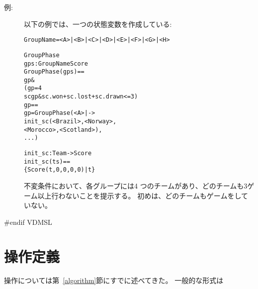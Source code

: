 \documentclass[\pformat,12pt]{jarticle}
\begin{document}
\begin{description}
\item[例:] 以下の例では、一つの状態変数を作成している:
  \begin{alltt}

  GroupName = <A> | <B> | <C> | <D> | <E> | <F> | <G> | <H>

   GroupPhase 
    gps :  GroupName  Score
  GroupPhase(gps) ==
     gp  & 
      ( gp = 4 
        sc  gp & sc.won + sc.lost + sc.drawn <= 3)
   gp ==
    gp = GroupPhase ({ <A> |-> 
                                init_sc ({<Brazil>, <Norway>, 
                                    <Morocco>, <Scotland>}),
                         ...})


  init_sc :  Team ->  Score
  init_sc (ts) ==
    \{ Score (t,0,0,0,0) | t  \}
  \end{alltt}
  不変条件において、各グループには4 つのチームがあり、どのチームも3ゲーム以上行わないことを提示する。
  初めは、どのチームもゲームをしていない。

\end{description}
#endif VDMSL

\section{操作定義} \label{op-def}

操作については第~\ref{algorithm}節にすでに述べてきた。 
一般的な形式は
\end{document}
